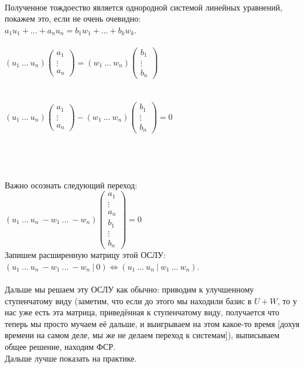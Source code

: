 \documentclass[a4paper,11pt]{report}
\begin{document}
\\
Полученное тождоество является однородной системой линейных уравнений, покажем это, если не очень очевидно:\\
$a_1u_1 + ... + a_nu_n =  b_1w_1 + ... + b_kw_k $.\\
\\
$(u_1\ ...\ u_n)
\begin{pmatrix}
 a_1\\
 \vdots\\
 a_n
\end{pmatrix}
=  
(w_1\ ...\ w_n)
\begin{pmatrix}
 b_1\\
 \vdots\\
 b_n
\end{pmatrix}
$\\\\\\
$(u_1\ ...\ u_n)
\begin{pmatrix}
 a_1\\
 \vdots\\
 a_n
\end{pmatrix}
-(w_1\ ...\ w_n)
\begin{pmatrix}
 b_1\\
 \vdots\\
 b_n
\end{pmatrix}
=  0
$\\
\\\\\\\\
Важно осознать следующий переход:\\
$(u_1\ ...\ u_n\ -w_1\ ...\ -w_n)
\begin{pmatrix}
 a_1\\
 \vdots\\
 a_n\\
 b_1\\
 \vdots\\
 b_n
\end{pmatrix}
=  0
$\\
Запишем расширенную матрицу этой ОСЛУ:\\
$(u_1\ ...\ u_n\ -w_1\ ...\ -w_n\ |\ 0) \Leftrightarrow (u_1\ ...\ u_n\ |\ w_1\ ...\ w_n)$.\\
\\
Дальше мы решаем эту ОСЛУ как обычно: приводим к улучшенному ступенчатому виду (заметим, что если до этого мы находили базис в 
$U + W$, то у нас уже есть эта матрица, приведённая к ступенчатому виду, получается что теперь мы просто мучаем её дальше, и выигрываем
на этом какое-то время [дохуя времени на самом деле, мы же не делаем переход к системам]), выписываем общее решение, находим ФСР.\\
Дальше лучше показать на практике.\\
\end{document}
